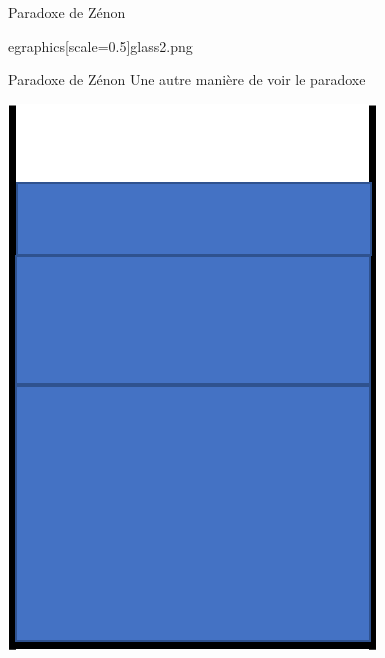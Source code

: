 \documentclass[11pt]{beamer}
\begin{document}
\begin{frame}{Paradoxe de Zénon}
\begin{center}
egraphics[scale=0.5]{glass2.png}
\end{center}
\end{frame}
\begin{frame}{Paradoxe de Zénon}
Une autre manière de voir le paradoxe
\begin{center}
	\includegraphics[scale=0.5]{glass3.png}
\end{center}
\end{frame}
\end{document}
